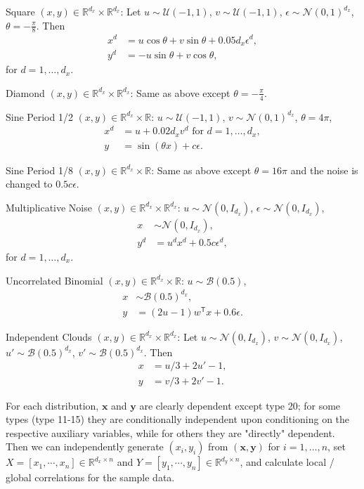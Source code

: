 \documentclass[11pt]{article}
\providecommand{\mb}[1]{\boldsymbol{#1}}
\providecommand{\mc}[1]{\mathcal{#1}}
\newcommand{\Real}{\mathbb{R}}
\newcommand{\T}{^{\ensuremath{\mathsf{T}}}}           %
\begin{document}
\begin{compactenum}
\item Square $(x,y) \in \Real^{d_{x}} \times \Real^{d_{x}}$: Let $u \sim \mc{U}(-1,1)$, $v \sim \mc{U}(-1,1)$, $\epsilon \sim \mc{N}(0,1)^{d_{x}}$, $\theta=-\frac{\pi}{8}$. Then
\begin{align*}
x^{d}&=u \cos\theta + v \sin\theta + 0.05 d_{x}\epsilon^{d},\\
y^{d}&=-u \sin\theta + v \cos\theta,
\end{align*}
for $d=1,\ldots,d_{x}$.
\item Diamond $(x,y) \in \Real^{d_{x}} \times \Real^{d_{x}}$: Same as above except $\theta=-\frac{\pi}{4}$.
\item Sine Period 1/2 $(x,y) \in \Real^{d_{x}} \times \Real$: $u \sim \mc{U}(-1,1)$, $v \sim \mc{N}(0,1)^{d_{x}}$, $\theta=4\pi$,
\begin{align*}
x^{d}&=u+0.02 d_{x} v^{d} \mbox{ for $d=1,\ldots,d_{x}$}, \\
y&=\sin ( \theta x )+c\epsilon.
\end{align*}
\item Sine Period 1/8 $(x,y) \in \Real^{d_{x}} \times \Real$: Same as above except $\theta=16\pi$ and the noise is changed to $0.5c\epsilon$.
\item Multiplicative Noise $(x,y) \in \Real^{d_{x}} \times \Real^{d_{x}}$: $u \sim \mc{N}(0, I_{d_{x}})$, $\epsilon \sim \mc{N}(0, I_{d_{x}})$,
\begin{align*}
x &\sim \mc{N}(0, I_{d_{x}}),\\
y^{d}&=u^{d}x^{d}+0.5c\epsilon^{d},
\end{align*}
for $d=1,\ldots,d_{x}$.
\item Uncorrelated Binomial $(x,y) \in \Real^{d_{x}} \times \Real$: $u \sim \mc{B}(0.5)$,
\begin{align*}
x &\sim \mc{B}(0.5)^{d_{x}},\\ 
y&=(2u-1)w\T x+0.6\epsilon.
\end{align*}
\item Independent Clouds $(x,y) \in \Real^{d_{x}} \times \Real^{d_{x}}$: Let $u \sim \mc{N}(0,I_{d_{x}})$, $v \sim \mc{N}(0,I_{d_{x}})$, $u' \sim \mc{B}(0.5)^{d_{x}}$, $v' \sim \mc{B}(0.5)^{d_{x}}$. Then
\begin{align*}
x&=u/3+2u'-1,\\
y&=v/3+2v'-1.
\end{align*}
\end{compactenum}

For each distribution, $\mb{x}$ and $\mb{y}$ are clearly dependent except type 20; for some types (type 11-15) they are conditionally independent upon conditioning on the respective auxiliary variables, while for others they are "directly" dependent. Then we can independently generate $(x_{i},y_{i})$ from $(\mb{x},\mb{y})$ for $i=1,\ldots,n$, set $X=[x_{1},\cdots, x_{n}] \in \Real^{d_{x} \times n}$ and $Y=[y_{1},\cdots, y_{n}] \in \Real^{d_{y} \times n}$, and calculate local / global correlations for the sample data.
\end{document}
